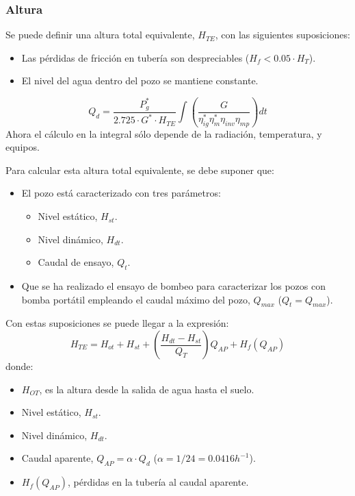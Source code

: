 \subsubsection{Altura}
\label{sec:orgf29bb1a}
Se puede definir una altura total equivalente, \(H_{TE}\), con las siguientes suposiciones:
\begin{itemize}
\item Las pérdidas de fricción en tubería son despreciables (\(H_f < 0.05 \cdot H_T\)).
\item El nivel del agua dentro del pozo se mantiene constante.
\end{itemize}
\begin{equation}
Q_d = \frac{P^*_g}{2.725 \cdot G^* \cdot H_{TE}} \int \left( \frac{G}{\eta_{ig}^{*} \eta_{m}^{*} \eta_{inv} \eta_{mp}} \right) dt
\end{equation}
Ahora el cálculo en la integral sólo depende de la radiación, temperatura, y equipos.

Para calcular esta altura total equivalente, se debe suponer que:
\begin{itemize}
\item El pozo está caracterizado con tres parámetros:
\begin{itemize}
\item Nivel estático, \(H_{st}\).
\item Nivel dinámico, \(H_{dt}\).
\item Caudal de ensayo, \(Q_t\). 
\end{itemize}
\item Que se ha realizado el ensayo de bombeo para caracterizar los pozos con bomba portátil empleando el caudal máximo del pozo, \(Q_{max}\) (\(Q_t=Q_{max}\)).
\end{itemize}

Con estas suposiciones se puede llegar a la expresión:
\begin{equation}
H_{TE} = H_{ot} + H_{st} + \left( \frac{H_{dt} - H_{st}}{Q_T} \right) Q_{AP} + H_f(Q_{AP})
\end{equation}
donde:
\begin{itemize}
\item \(H_{OT}\), es la altura desde la salida de agua hasta el suelo.
\item Nivel estático, \(H_{st}\).
\item Nivel dinámico, \(H_{dt}\).
\item Caudal aparente, \(Q_{AP} = \alpha \cdot Q_d\)
(\(\alpha=1/24=0.0416h^{-1}\)).
\item \(H_f(Q_{AP})\), pérdidas en la tubería al caudal aparente.
\end{itemize}

